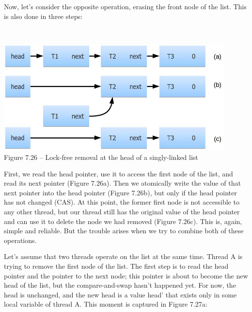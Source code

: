 Now, let's consider the opposite operation, erasing the front node of the list. This is also done in three steps:

\hspace*{\fill} \\ %
\begin{center}
\includegraphics[width=0.9\textwidth]{content/2/chapter7/images/26.jpg}\\
Figure 7.26 – Lock-free removal at the head of a singly-linked list
\end{center}

First, we read the head pointer, use it to access the first node of the list, and read its next pointer (Figure 7.26a). Then we atomically write the value of that next pointer into the head pointer (Figure 7.26b), but only if the head pointer has not changed (CAS). At this point, the former first node is not accessible to any other thread, but our thread still has the original value of the head pointer and can use it to delete the node we had removed (Figure 7.26c). This is, again, simple and reliable. But the trouble arises when we try to combine both of these operations. 

Let's assume that two threads operate on the list at the same time. Thread A is trying to remove the first node of the list. The first step is to read the head pointer and the pointer to the next node; this pointer is about to become the new head of the list, but the compare-and-swap hasn't happened yet. For now, the head is unchanged, and the new head is a value head' that exists only in some local variable of thread A. This moment is captured in Figure 7.27a:

